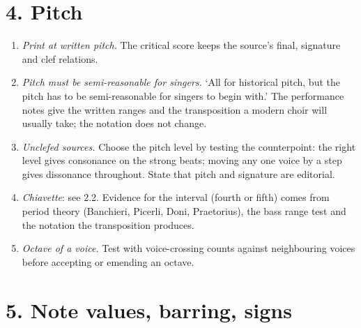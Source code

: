 \section*{4. Pitch}

\begin{enumerate}

\tightlist
\item
  \textit{Print at written pitch.} The critical score keeps the source's final, signature and clef relations.
\item
  \textit{Pitch must be semi-reasonable for singers.} ‘All for historical pitch, but the pitch has to be semi-reasonable for singers to begin with.’ The performance notes give the written ranges and the transposition a modern choir will usually take; the notation does not change.
\item
  \textit{Unclefed sources.} Choose the pitch level by testing the counterpoint: the right level gives consonance on the strong beats; moving any one voice by a step gives dissonance throughout. State that pitch and signature are editorial.
\item
  \textit{Chiavette}: see 2.2. Evidence for the interval (fourth or fifth) comes from period theory (Banchieri, Picerli, Doni, Praetorius), the bass range test and the notation the transposition produces.
\item
  \textit{Octave of a voice.} Test with voice-crossing counts against neighbouring voices before accepting or emending an octave.
\end{enumerate}

\section*{5. Note values, barring, signs}

